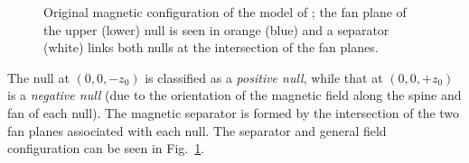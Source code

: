 \documentclass[a4paper,11pt,usenames,dvipsnames]{article}
\begin{document}
  \begin{figure}[t]
   \centering
   \caption{Original magnetic configuration of the model of \citet{paper:Wilmot-SmithHornig2011}; the fan plane of the upper (lower) null is seen in orange (blue) and a separator (white) links both nulls at the intersection of the fan planes.} 
   \label{fig:WS}
  \end{figure}
The null at $(0,0,-z_0)$ is classified as a \emph{positive null}, while that at $(0,0,+z_0)$ is a \emph{negative null} (due to the orientation of the magnetic field along the spine and fan of each null). The magnetic separator is formed by the intersection of the two fan planes associated with each null. The separator and general field configuration can be seen in Fig.~\ref{fig:WS}. 
\end{document}
